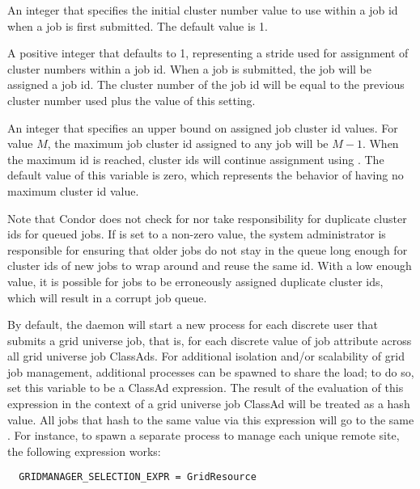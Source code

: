 \begin{description}
\label{param:ScheddClusterInitialValue}
\item[\Macro{SCHEDD\_CLUSTER\_INITIAL\_VALUE}]
  An integer that specifies the initial cluster number value to use within a
  job id when a job is first submitted.
  The default value is 1.

\label{param:ScheddClusterIncrementValue}
\item[\Macro{SCHEDD\_CLUSTER\_INCREMENT\_VALUE}]
  A positive integer that defaults to 1, representing a stride used
  for assignment of cluster numbers within a job id.
  When a job is submitted, the job will be assigned a job id.  The cluster
  number of the job id will be equal to the previous cluster number used
  plus the value of this setting.

\label{param:ScheddClusterMaximumValue}
\item[\Macro{SCHEDD\_CLUSTER\_MAXIMUM\_VALUE}]
  An integer that specifies an upper bound on assigned job cluster id values.
  For value $M$, the maximum job cluster id assigned to 
  any job will be $M-1$. When the maximum id is reached, cluster ids will 
  continue assignment using . The 
  default value of this variable is zero,
  which represents the behavior of having no maximum cluster id value. 

  Note that Condor does not check for nor take responsibility for duplicate
  cluster ids for queued jobs. 
  If  is set to a non-zero value,
  the system administrator is
  responsible for ensuring that older jobs do not stay in the queue long
  enough for cluster ids of new jobs to wrap around and reuse the same id.
  With a low enough value, it is possible for jobs to be erroneously assigned 
  duplicate cluster ids, which will result in a corrupt job queue.

\label{param:GridManagerSelectionExpr}
\item[\Macro{GRIDMANAGER\_SELECTION\_EXPR}]
  By default, the  daemon will start a new 
   process for each
  discrete user that submits a grid universe job,
  that is, for each discrete value of job attribute  across
  all grid universe job ClassAds.
  For additional isolation and/or scalability of grid job management,
  additional  processes can be spawned to share the load;
  to do so, set this variable to be a ClassAd expression.
  The result of the evaluation of this expression in the
  context of a grid universe job ClassAd will be treated as a hash value.
  All jobs that hash to the same value via this expression will go to the
  same .
  For instance, to spawn a separate  process to
  manage each unique remote site, the following expression works:
\begin{verbatim}
  GRIDMANAGER_SELECTION_EXPR = GridResource 
\end{verbatim}


\end{description}
